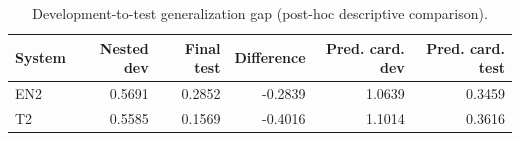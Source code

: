 \begin{table}[t]
\centering
\small
\caption{Development-to-test generalization gap (post-hoc descriptive comparison).}
\label{tab:generalization}
\begin{tabular}{lrrrrr}
\toprule
System & Nested dev & Final test & Difference & Pred. card. dev & Pred. card. test \\
\midrule
EN2 & 0.5691 & 0.2852 & -0.2839 & 1.0639 & 0.3459 \\
T2 & 0.5585 & 0.1569 & -0.4016 & 1.1014 & 0.3616 \\
\bottomrule
\end{tabular}
\end{table}
